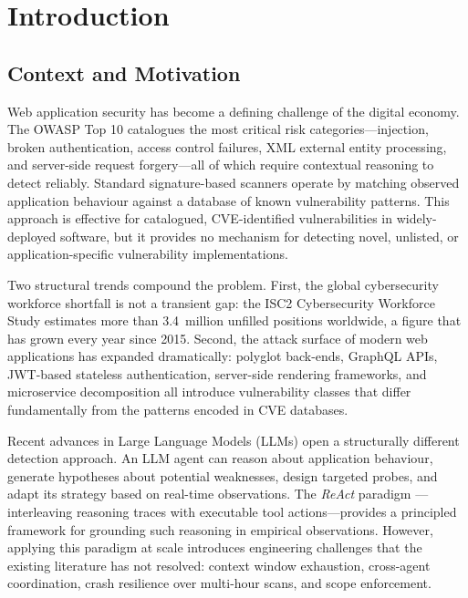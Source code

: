\documentclass[12pt, a4paper, oneside, openany]{book}
\begin{document}
\cleardoublepage

\mainmatter
{}

\chapter*{Introduction}

\section*{Context and Motivation}

Web application security has become a defining challenge of the digital economy. The OWASP Top 10 \citep{owasp2021top10} catalogues the most critical risk categories---injection, broken authentication, access control failures, XML external entity processing, and server-side request forgery---all of which require contextual reasoning to detect reliably. Standard signature-based scanners operate by matching observed application behaviour against a database of known vulnerability patterns. This approach is effective for catalogued, CVE-identified vulnerabilities in widely-deployed software, but it provides no mechanism for detecting novel, unlisted, or application-specific vulnerability implementations.

Two structural trends compound the problem. First, the global cybersecurity workforce shortfall is not a transient gap: the ISC2 Cybersecurity Workforce Study \citep{isc2workforce2023} estimates more than 3.4~million unfilled positions worldwide, a figure that has grown every year since 2015. Second, the attack surface of modern web applications has expanded dramatically: polyglot back-ends, GraphQL APIs, JWT-based stateless authentication, server-side rendering frameworks, and microservice decomposition all introduce vulnerability classes that differ fundamentally from the patterns encoded in CVE databases.

Recent advances in Large Language Models (LLMs) open a structurally different detection approach. An LLM agent can reason about application behaviour, generate hypotheses about potential weaknesses, design targeted probes, and adapt its strategy based on real-time observations. The \textit{ReAct} paradigm \citep{yao2023react}---interleaving reasoning traces with executable tool actions---provides a principled framework for grounding such reasoning in empirical observations. However, applying this paradigm at scale introduces engineering challenges that the existing literature has not resolved: context window exhaustion, cross-agent coordination, crash resilience over multi-hour scans, and scope enforcement.
\end{document}
